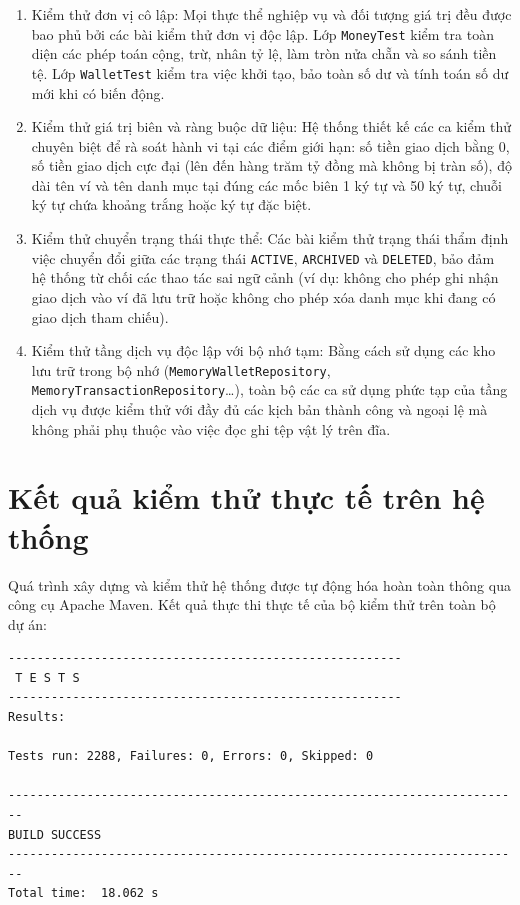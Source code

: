 \documentclass[a4paper,12pt]{report}
\newcommand{\passthrough}[1]{#1}
\begin{document}
\begin{enumerate}
\def\labelenumi{\arabic{enumi}.}
\item
  Kiểm thử đơn vị cô lập: Mọi thực thể nghiệp vụ và đối tượng giá trị
  đều được bao phủ bởi các bài kiểm thử đơn vị độc lập. Lớp
  \passthrough{\lstinline!MoneyTest!} kiểm tra toàn diện các phép toán
  cộng, trừ, nhân tỷ lệ, làm tròn nửa chẵn và so sánh tiền tệ. Lớp
  \passthrough{\lstinline!WalletTest!} kiểm tra việc khởi tạo, bảo toàn
  số dư và tính toán số dư mới khi có biến động.
\item
  Kiểm thử giá trị biên và ràng buộc dữ liệu: Hệ thống thiết kế các ca
  kiểm thử chuyên biệt để rà soát hành vi tại các điểm giới hạn: số tiền
  giao dịch bằng 0, số tiền giao dịch cực đại (lên đến hàng trăm tỷ đồng
  mà không bị tràn số), độ dài tên ví và tên danh mục tại đúng các mốc
  biên 1 ký tự và 50 ký tự, chuỗi ký tự chứa khoảng trắng hoặc ký tự đặc
  biệt.
\item
  Kiểm thử chuyển trạng thái thực thể: Các bài kiểm thử trạng thái thẩm
  định việc chuyển đổi giữa các trạng thái
  \passthrough{\lstinline!ACTIVE!}, \passthrough{\lstinline!ARCHIVED!}
  và \passthrough{\lstinline!DELETED!}, bảo đảm hệ thống từ chối các
  thao tác sai ngữ cảnh (ví dụ: không cho phép ghi nhận giao dịch vào ví
  đã lưu trữ hoặc không cho phép xóa danh mục khi đang có giao dịch tham
  chiếu).
\item
  Kiểm thử tầng dịch vụ độc lập với bộ nhớ tạm: Bằng cách sử dụng các
  kho lưu trữ trong bộ nhớ
  (\passthrough{\lstinline!MemoryWalletRepository!},
  \passthrough{\lstinline!MemoryTransactionRepository!}\ldots), toàn bộ
  các ca sử dụng phức tạp của tầng dịch vụ được kiểm thử với đầy đủ các
  kịch bản thành công và ngoại lệ mà không phải phụ thuộc vào việc đọc
  ghi tệp vật lý trên đĩa.
\end{enumerate}

\section{Kết quả kiểm thử thực tế trên hệ
thống}\label{kux1ebft-quux1ea3-kiux1ec3m-thux1eed-thux1ef1c-tux1ebf-truxean-hux1ec7-thux1ed1ng}

Quá trình xây dựng và kiểm thử hệ thống được tự động hóa hoàn toàn thông
qua công cụ Apache Maven. Kết quả thực thi thực tế của bộ kiểm thử trên
toàn bộ dự án:

\begin{lstlisting}
-------------------------------------------------------
 T E S T S
-------------------------------------------------------
Results:

Tests run: 2288, Failures: 0, Errors: 0, Skipped: 0

------------------------------------------------------------------------
BUILD SUCCESS
------------------------------------------------------------------------
Total time:  18.062 s
\end{lstlisting}
\end{document}
